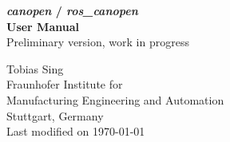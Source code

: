 \begin{titlepage}
\vspace*{13mm}
\begin{center}
  \vspace{10mm} 
         {\Large \bf {\em canopen} / {\em ros\_canopen}\\}
  \vspace{5mm}
       {\large
          \bf
          User Manual\\}
  \vspace{3mm}
         {  Preliminary version, work in progress\\}
              

  \vspace{80mm}
  \vspace{10mm}
         {\large Tobias Sing} \\
  \vspace{5mm}
         {\large Fraunhofer Institute for}\\
         {\large Manufacturing Engineering and Automation} \\
         \vspace{5mm}
         {\large Stuttgart, Germany} \\
  \vfill
         {\large Last modified on \today}
\end{center}
\end{titlepage}

\clearpage
\thispagestyle{empty}
\cleardoublepage
